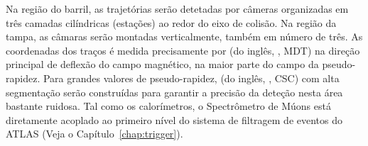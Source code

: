 Na região do barril, as trajetórias serão detetadas por câmeras organizadas em
três camadas cilíndricas (estações) ao redor do eixo de colisão. Na região da
tampa, as câmaras serão montadas verticalmente, também em número de três. As
coordenadas dos traços é medida precisamente por  (do inglês, , MDT) na direção
principal de deflexão do campo magnético, na maior parte do campo da
pseudo-rapidez. Para grandes valores de pseudo-rapidez,  (do inglês, , CSC) com
alta segmentação serão construídas para garantir a precisão da deteção nesta
área bastante ruidosa. Tal como os calorímetros, o Spectrômetro de Múons está
diretamente acoplado ao primeiro nível do sistema de filtragem de eventos do
ATLAS (Veja o Capítulo~\ref{chap:trigger}).

